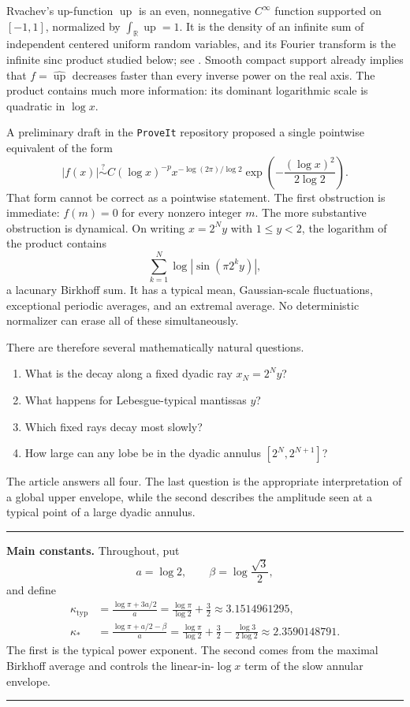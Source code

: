 \documentclass[11pt,oneside]{article}
\theoremstyle{definition}
\theoremstyle{remark}
\newcommand{\R}{\mathbb R}
\newcommand{\Up}{\operatorname{up}}
\newenvironment{boxedremark}{%
  \par\smallskip\noindent\begin{center}\begin{minipage}{0.94\textwidth}%
  \color{black}\hrule\vspace{0.6em}\small
}{%
  \vspace{0.6em}\hrule\end{minipage}\end{center}\smallskip
}
\begin{document}
Rvachev's up-function $\Up$ is an even, nonnegative $C^\infty$ function
supported on $[-1,1]$, normalized by $\int_{\R}\Up=1$.  It is the density of an
infinite sum of independent centered uniform random variables, and its Fourier
transform is the infinite sinc product studied below; see
\cite{arias1982,proveit,wikipedia}.  Smooth compact support already implies
that $f=\widehat{\Up}$ decreases faster than every inverse power on the real
axis.  The product contains much more information: its dominant logarithmic
scale is quadratic in $\log x$.

A preliminary draft in the \texttt{ProveIt} repository proposed a single
pointwise equivalent of the form
\begin{equation}
 |f(x)|\stackrel{?}{\sim}
 C(\log x)^{-p}x^{-\log(2\pi)/\log2}
 \exp\!\left(-\frac{(\log x)^2}{2\log2}\right).
 \label{eq:draft-form}
\end{equation}
That form cannot be correct as a pointwise statement.  The first obstruction is
immediate: $f(m)=0$ for every nonzero integer $m$.  The more substantive
obstruction is dynamical.  On writing $x=2^Ny$ with $1\le y<2$, the logarithm
of the product contains
\[
 \sum_{k=1}^{N}\log|\sin(\pi2^k y)|,
\]
a lacunary Birkhoff sum.  It has a typical mean, Gaussian-scale fluctuations,
exceptional periodic averages, and an extremal average.  No deterministic
normalizer can erase all of these simultaneously.

There are therefore several mathematically natural questions.
\begin{enumerate}
\item What is the decay along a fixed dyadic ray $x_N=2^Ny$?
\item What happens for Lebesgue-typical mantissas $y$?
\item Which fixed rays decay most slowly?
\item How large can any lobe be in the dyadic annulus $[2^N,2^{N+1}]$?
\end{enumerate}
The article answers all four.  The last question is the appropriate
interpretation of a global upper envelope, while the second describes the
amplitude seen at a typical point of a large dyadic annulus.

\begin{boxedremark}
\textbf{Main constants.}
Throughout, put
\[
 a=\log2,\qquad
 \beta=\log\frac{\sqrt3}{2},
\]
and define
\begin{align}
 \kappa_{\mathrm{typ}}
 &=\frac{\log\pi+3a/2}{a}
   =\frac{\log\pi}{\log2}+\frac32
   \approx3.1514961295,                                      \label{eq:ktyp}\\
 \kappa_*
 &=\frac{\log\pi+a/2-\beta}{a}
   =\frac{\log\pi}{\log2}+\frac32-
     \frac{\log3}{2\log2}
   \approx2.3590148791.                                      \label{eq:kstar}
\end{align}
The first is the typical power exponent.  The second comes from the maximal
Birkhoff average and controls the linear-in-$\log x$ term of the slow annular
envelope.
\end{boxedremark}
\end{document}
